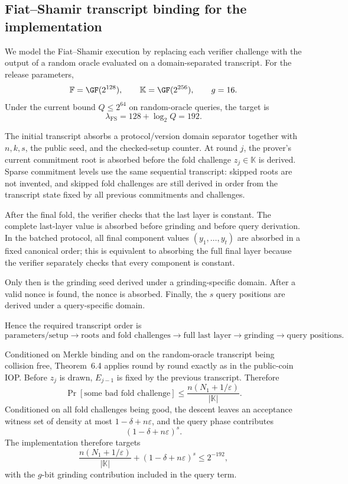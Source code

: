 \subsection{Fiat--Shamir transcript binding for the implementation}
\label{sec:fs-implementation}

We model the Fiat--Shamir execution by replacing each verifier challenge with
the output of a random oracle evaluated on a domain-separated transcript.
For the release parameters,
\[
\mathbb F=\GF(2^{128}),\qquad
\mathbb K=\GF(2^{256}),\qquad
g=16.
\]
Under the current bound \(Q\le 2^{64}\) on random-oracle queries, the target is
\[
\lambda_{\mathrm{FS}}=128+\log_2 Q=192.
\]

The initial transcript absorbs a protocol/version domain separator together
with \(n,k,s\), the public seed, and the checked-setup counter.  At round \(j\),
the prover's current commitment root is absorbed before the fold challenge
\(z_j\in\mathbb K\) is derived.  Sparse commitment levels use the same
sequential transcript: skipped roots are not invented, and skipped fold
challenges are still derived in order from the transcript state fixed by all
previous commitments and challenges.

After the final fold, the verifier checks that the last layer is constant.
The complete last-layer value is absorbed before grinding and before query
derivation.  In the batched protocol, all final component values
\((y_1,\ldots,y_t)\) are absorbed in a fixed canonical order; this is
equivalent to absorbing the full final layer because the verifier separately
checks that every component is constant.

Only then is the grinding seed derived under a grinding-specific domain.
After a valid nonce is found, the nonce is absorbed.  Finally, the \(s\) query
positions are derived under a query-specific domain.

Hence the required transcript order is
\[
\boxed{
\text{parameters/setup}
\rightarrow
\text{roots and fold challenges}
\rightarrow
\text{full last layer}
\rightarrow
\text{grinding}
\rightarrow
\text{query positions}.
}
\]

Conditioned on Merkle binding and on the random-oracle transcript being
collision free, Theorem~6.4 applies round by round exactly as in the
public-coin IOP.  Before \(z_j\) is drawn, \(E_{j-1}\) is fixed by the previous
transcript.  Therefore
\[
\Pr[\text{some bad fold challenge}]
\le
\frac{n(N_1+1/\varepsilon)}{|\mathbb K|}.
\]
Conditioned on all fold challenges being good, the descent leaves an
acceptance witness set of density at most \(1-\delta+n\varepsilon\), and the
query phase contributes
\[
(1-\delta+n\varepsilon)^s.
\]
The implementation therefore targets
\[
\frac{n(N_1+1/\varepsilon)}{|\mathbb K|}
+
(1-\delta+n\varepsilon)^s
\le 2^{-192},
\]
with the \(g\)-bit grinding contribution included in the query term.


